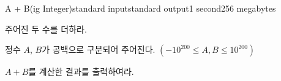 \begin{problem}{A + B(ig Integer)}{standard input}{standard output}{1 second}{256 megabytes}

주어진 두 수를 더하라.

\InputFile
정수 $A$, $B$가 공백으로 구분되어 주어진다. $(-10^{200} \le A, B \le 10^{200})$

\OutputFile
$A + B$를 계산한 결과를 출력하여라.

\Example

\begin{example}
%
\end{example}

\end{problem}

